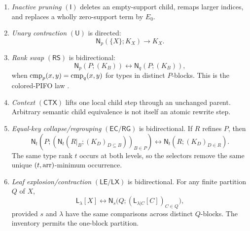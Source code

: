 \begin{enumerate}
\item \emph{Inactive pruning} \((\mathsf I)\) deletes an empty-support child,
      remaps larger indices, and replaces a wholly zero-support term by
      \(E_0\).
\item \emph{Unary contraction} \((\mathsf U)\) is directed:
      \begin{equation}
       \mathsf N_p(\{X\};K_X)\longrightarrow K_X.
       \label{eq:rewrite-unary}
      \end{equation}
\item \emph{Rank swap} \((\mathsf{RS})\) is bidirectional:
      \begin{equation}
       \mathsf N_p(P;(K_B))\longleftrightarrow
       \mathsf N_q(P;(K_B)),
       \label{eq:rewrite-rank-swap}
      \end{equation}
      when \(\operatorname{cmp}_p(x,y)=\operatorname{cmp}_q(x,y)\) for types in distinct
      \(P\)-blocks.  This is the colored-PIFO law
      .
\item \emph{Context} \((\mathsf{CTX})\) lifts one local child step through an
      unchanged parent.  Arbitrary semantic child equivalence is not itself
      an atomic rewrite step.
\item \emph{Equal-key collapse/regrouping} \((\mathsf{EC/RG})\) is
      bidirectional.  If \(R\) refines \(P\), then
      \begin{equation}
      \mathsf N_t\!\left(P;
        \left(\mathsf N_t(R|_B;(K_D)_{D\subseteq B})\right)_{B\in P}
      \right)
      \longleftrightarrow
      \mathsf N_t(R;(K_D)_{D\in R}).
      \label{eq:rewrite-collapse-regroup}
      \end{equation}
      The same type rank \(t\) occurs at both levels, so the selectors remove
      the same unique \((t,\operatorname{arr})\)-minimum occurrence.
\item \emph{Leaf explosion/contraction} \((\mathsf{LE/LX})\) is
      bidirectional.  For any finite partition \(Q\) of \(X\),
      \begin{equation}
       \mathsf L_\lambda[X]
       \longleftrightarrow
       \mathsf N_s\bigl(Q;
          (\mathsf L_{\lambda|C}[C])_{C\in Q}\bigr),
       \label{eq:rewrite-leaf-explosion}
      \end{equation}
      provided \(s\) and \(\lambda\) have the same comparisons across
      distinct \(Q\)-blocks.  The inventory permits the one-block partition.
\end{enumerate}

